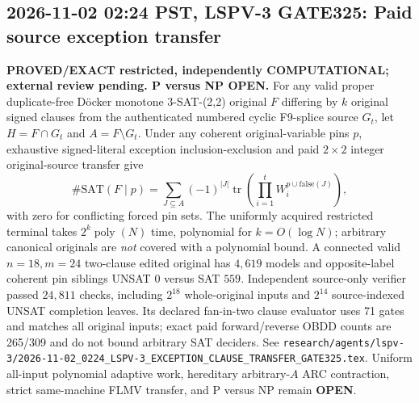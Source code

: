 \subsection*{2026-11-02 02:24 PST, LSPV-3 GATE325: Paid source exception transfer}
\textbf{PROVED/EXACT restricted, independently COMPUTATIONAL; external review pending. P versus NP OPEN.}
For any valid proper duplicate-free D\"ocker monotone 3-SAT-(2,2)
original $F$ differing by $k$ original signed clauses from the
authenticated numbered cyclic F9-splice source $G_t$, let
$H=F\cap G_t$ and $A=F\setminus G_t$. Under any coherent
original-variable pins $p$, exhaustive signed-literal exception
inclusion-exclusion and paid $2\times2$ integer original-source transfer
give
\[
  \#\mathrm{SAT}(F\mid p)=
  \sum_{J\subseteq A}(-1)^{|J|}
  \operatorname{tr}\left(\prod_{i=1}^t W_i^{p\cup\mathrm{false}(J)}\right),
\]
with zero for conflicting forced pin sets. The uniformly acquired
restricted terminal takes $2^k\operatorname{poly}(N)$ time, polynomial
for $k=O(\log N)$; arbitrary canonical originals are \emph{not}
covered with a polynomial bound. A connected valid $n=18,m=24$
two-clause edited original has $4,619$ models and opposite-label
coherent pin siblings UNSAT $0$ versus SAT $559$. Independent
source-only verifier passed $24,811$ checks, including $2^{18}$
whole-original inputs and $2^{14}$ source-indexed UNSAT completion
leaves. Its declared fan-in-two clause evaluator uses 71 gates and
matches all original inputs; exact paid forward/reverse OBDD counts
are 265/309 and do not bound arbitrary SAT deciders.
See \texttt{research/agents/lspv-3/2026-11-02\_0224\_LSPV-3\_EXCEPTION\_CLAUSE\_TRANSFER\_GATE325.tex}.
Uniform all-input polynomial adaptive work, hereditary arbitrary-$A$
ARC contraction, strict same-machine FLMV transfer, and P versus NP
remain \textbf{OPEN}.
